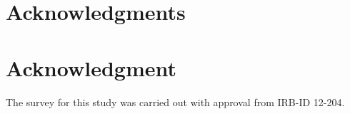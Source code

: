 \ifCLASSOPTIONcompsoc
  \section*{Acknowledgments}
\else
  \section*{Acknowledgment}
\fi


The survey for this study was carried out with approval from  IRB-ID 12-204.


\ifCLASSOPTIONcaptionsoff
  \newpage
\fi







%
%
%
%
%
%
%

